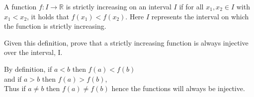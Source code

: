\documentclass[a4paper]{exam}
\theoremstyle{definition}
\newcommand\R{\ensuremath{\mathbb{R}}}
\begin{document}
\begin{questions}

\question A function \(f: I \rightarrow \R\) is strictly increasing on an interval \(I\) if for all \(x_1, x_2 \in I\) with \(x_1 < x_2\), it holds that \(f(x_1) < f(x_2)\). Here $I$ represents the interval on which the function is strictly increasing.
  
  Given this definition, prove that a strictly increasing function is always injective over the interval, I.

  \begin{solution}
    
  By definition, if $a < b$ then $f(a) < f(b)$\\
  and if $a > b$ then $f(a) > f(b)$, \\
  Thus if $a \not = b$ then  $f(a) \not = f(b)$ hence the functions will always be injective.
    
    
  \end{solution}
\end{questions}
\end{document}
